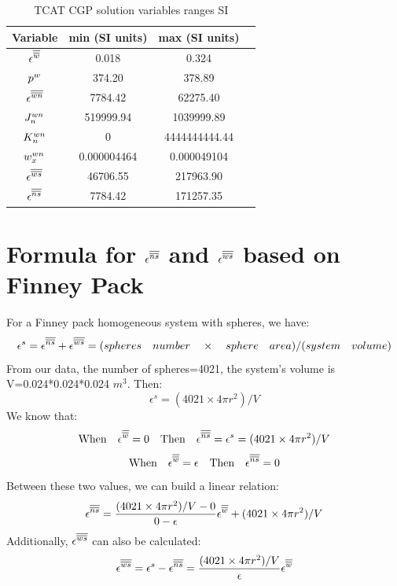 \documentclass{article}
\begin{document}
 \begin{table}[h!]
\centering
 \begin{tabular}{ c c  c c} 
 \hline
Variable   & min (SI units) &  max (SI units)\\  [1ex]
 \hline
\( \ew\)  &  0.018   & 0.324  \\
\( \paw\)  &  374.20 & 378.89  \\
\( \ewn\)  &  7784.42 & 62275.40 \\
\( J_n^\wn\)  &  519999.94& 1039999.89 \\
\(K_n^\wn\)  &  0  & 4444444444.44  \\
\(w_x^\wn\)  & 0.000004464   & 0.000049104 \\
\(\ews\)  &  46706.55 & 217963.90\\
\(\ens\)  &  7784.42 & 171257.35\\[1ex] 
 \hline
 \end{tabular}
 \caption{TCAT CGP solution variables ranges SI}
\label{table:6}
\end{table}
\pagebreak
\section{Formula for \(\ens\) and \(\ews\) based on Finney Pack}
For a Finney pack homogeneous system with spheres, we have:
\begin{equation}
{\epsilon}^s=  \ens+\ews= (spheres \quad number  \quad \times \quad  sphere  \quad area) /  (system \quad   volume )
\label{eq:es_formula}
\end{equation}
From our data, the number of spheres=4021, the system's volume is V=0.024*0.024*0.024 \(m^3\). Then:
\begin{equation}
{\epsilon}^s=(4021 \times 4  \pi r^2)/V 
\label{eq:es_formula}
\end{equation}
We know that:
\begin{equation}
\textrm{When} \quad  \ew=0 \quad \textrm{Then} \quad \ens={\epsilon}^s=(4021 \times 4  \pi r^2)/V 
\label{eq:ens_ew0}
\end{equation}
\begin{equation}
\textrm{When} \quad  \ew=\gke \quad \textrm{Then} \quad \ens=0
\label{eq:ens_ewe}
\end{equation}
Between these two values, we can build a linear relation:
\begin{equation}
\ens= \frac{(4021 \times 4  \pi r^2)/V - 0 }{0-\gke}\ew+(4021 \times 4  \pi r^2)/V
\label{eq:ens_linear}
\end{equation}
Additionally,  \(\ews\) can also be calculated:
\begin{equation}
\ews={\epsilon}^s-\ens= \frac{(4021 \times 4  \pi r^2)/V }{\gke}\ew
\label{eq:ews_linear}
\end{equation}
\end{document}
